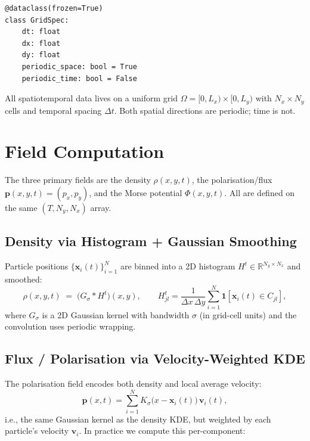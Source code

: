 \documentclass[11pt]{article}
\newcommand{\R}{\mathbb{R}}
\newcommand{\bx}{\mathbf{x}}
\newcommand{\bp}{\mathbf{p}}
\newcommand{\bv}{\mathbf{v}}
\begin{document}
\begin{lstlisting}[caption={grid.py --- GridSpec dataclass}]
@dataclass(frozen=True)
class GridSpec:
    dt: float
    dx: float
    dy: float
    periodic_space: bool = True
    periodic_time: bool = False
\end{lstlisting}

All spatiotemporal data lives on a uniform grid
$\Omega = [0, L_x) \times [0, L_y)$ with $N_x \times N_y$ cells and
temporal spacing $\Delta t$.  Both spatial directions are periodic;
time is not.


\section{Field Computation}
\label{sec:fields}

The three primary fields are the density $\rho(x,y,t)$, the
polarisation/flux $\bp(x,y,t) = (p_x, p_y)$, and the Morse potential
$\Phi(x,y,t)$.  All are defined on the same $(T, N_y, N_x)$ array.


\subsection{Density via Histogram + Gaussian Smoothing}

Particle positions $\{\bx_i(t)\}_{i=1}^N$ are binned into a 2D
histogram $H^t \in \R^{N_y \times N_x}$ and smoothed:
\begin{equation}
  \rho(x,y,t) \;=\; \bigl(G_\sigma * H^t\bigr)(x,y),
  \qquad
  H^t_{jl} = \frac{1}{\Delta x \,\Delta y}
  \sum_{i=1}^N \mathbf{1}[\bx_i(t) \in C_{jl}],
\end{equation}
where $G_\sigma$ is a 2D Gaussian kernel with bandwidth $\sigma$ (in
grid-cell units) and the convolution uses periodic wrapping.


\subsection{Flux / Polarisation via Velocity-Weighted KDE}

The polarisation field encodes both density and local average velocity:
\begin{equation}
  \bp(x,t) = \sum_{i=1}^N K_\sigma\!\bigl(x - \bx_i(t)\bigr)\,\bv_i(t),
\end{equation}
i.e., the same Gaussian kernel as the density KDE, but weighted by each
particle's velocity $\bv_i$.  In practice we compute this per-component:
\end{document}
